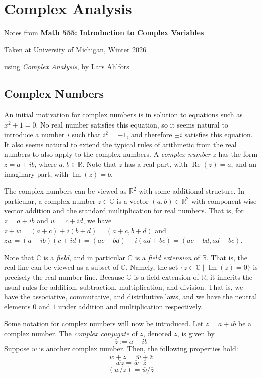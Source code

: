 \section{Complex Analysis}

\begin{center}
    Notes from \textbf{Math 555: Introduction to Complex Variables}

    Taken at University of Michigan, Winter 2026

    using \textit{Complex Analysis}, by Lars Ahlfors
\end{center}

\subsection{Complex Numbers}

An initial motivation for complex numbers is in solution to equations such as $x^2+1=0$. No real number satisfies this equation, so it seems natural to introduce a number $i$ such that $i^2=-1$, and therefore $\pm i$ satisfies this equation. It also seems natural to extend the typical rules of arithmetic from the real numbers to also apply to the complex numbers. A \textit{complex number} $z$ has the form $z=a+ib$, where $a,b\in\mathbb{R}$. Note that $z$ has a real part, with $\operatorname{Re}(z) = a$, and an imaginary part, with $\operatorname{Im}(z)=b$.

The complex numbers can be viewed as $\mathbb{R}^2$ with some additional structure. In particular, a complex number $z\in \mathbb{C}$ is a vector $(a,b)\in\mathbb{R}^2$ with component-wise vector addition and the standard multiplication for real numbers. That is, for $z=a+ib$ and $w=c+id$, we have $z+w = (a+c) + i(b+d) = (a+c, b+d)$ and $zw = (a+ib)(c+id) = (ac-bd)+i(ad+bc) = (ac-bd, ad+bc)$.

Note that $\mathbb{C}$ is a \textit{field}, and in particular $\mathbb{C}$ is a \textit{field extension} of $\mathbb{R}$. That is, the real line can be viewed as a subset of $\mathbb{C}$. Namely, the set $\{z\in\mathbb{C}\mid \operatorname{Im}(z)=0\}$ is precisely the real number line. Because $\mathbb{C}$ is a field extension of $\mathbb{R}$, it inherits the usual rules for addition, subtraction, multiplication, and division. That is, we have the associative, commutative, and distributive laws, and we have the neutral elements $0$ and $1$ under addition and multiplication respectively.

Some notation for complex numbers will now be introduced. Let $z=a+ib$ be a complex number. The \textit{complex conjugate} of $z$, denoted $\overline{z}$, is given by \[\overline{z}:=a-ib\] Suppose $w$ is another complex number. Then, the following properties hold: \[\overline{w+z} = \overline{w}+\overline{z}\tag{1}\] 
\[\overline{wz} = \overline{w}\cdot\overline{z}\tag{2}\] 
\[\overline{(w/z)} = \overline{w} / \overline{z}\tag{3}\]

